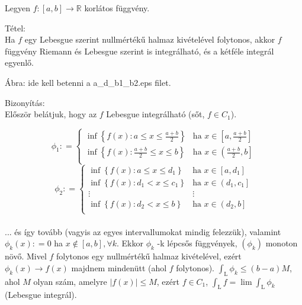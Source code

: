 \documentclass[12pt,a4paper]{scrartcl}
\newenvironment{tetel}{}{}
\newenvironment{bizonyitas}{}{}
\begin{document}
Legyen
\(\left. f:\left\lbrack {a,b} \right\rbrack\rightarrow{\mathbb{R}} \right.\)
korlátos függvény.

\begin{tetel}

Tétel:\\
Ha \(f\) egy Lebesgue szerint nullmértékű halmaz kivételével folytonos,
akkor \(f\) függvény Riemann és Lebesgue szerint is integrálható, és a
kétféle integrál egyenlő.

Ábra: ide kell betenni a a\_d\_b1\_b2.eps filet.

\end{tetel}

\begin{bizonyitas}

Bizonyítás:\\
Először belátjuk, hogy az \(f\) Lebesgue integrálható (sőt,
\(f \in C_{1}\)).

\[\phi_{1}: = \left\{ \begin{matrix}
{\inf\left\{ {f\left( x \right):a \leq x \leq \frac{a + b}{2}} \right\}} & {\text{ha~}x \in \left\lbrack {a,\frac{a + b}{2}} \right\rbrack} \\
{\inf\left\{ {f\left( x \right):\frac{a + b}{2} \leq x \leq b} \right\}} & {\text{ha~}x \in \left( {\frac{a + b}{2},b} \right\rbrack} \\
\end{matrix} \right.\] \[\phi_{2}: = \begin{cases}
{\inf\left\{ {f\left( x \right):a \leq x \leq d_{1}} \right\}} & {\text{ha~}x \in \left\lbrack {a,d_{1}} \right\rbrack} \\
{\inf\left\{ {f\left( x \right):d_{1} < x \leq c_{1}} \right\}} & {\text{ha~}x \in \left( {d_{1},c_{1}} \right\rbrack} \\
 \vdots & \vdots \\
{\inf\left\{ {f\left( x \right):d_{2} < x \leq b} \right\}} & {\text{ha~}x \in \left( {d_{2},b} \right\rbrack} \\
\end{cases}\]\\
... és így tovább (vagyis az egyes intervallumokat mindig felezzük),
valamint \(\phi_{k}\left( x \right): = 0\) ha
\(x \notin \left\lbrack {a,b} \right\rbrack,\forall k\). Ekkor
\(\phi_{k}\) -k lépcsős függvények, \(\left( \phi_{k} \right)\) monoton
növő. Mivel \(f\) folytonos egy nullmértékű halmaz kivételével, ezért
\(\left. \phi_{k}\left( x \right)\rightarrow f\left( x \right) \right.\)
majdnem mindenütt (ahol \(f\) folytonos).
\({\int_{\text{L}}\phi_{k}} \leq \left( {b - a} \right)M\), ahol \(M\)
olyan szám, amelyre \(\left| {f\left( x \right)} \right| \leq M\), ezért
\(f \in C_{1}\), \({\int_{\text{L}}f} = \lim{\int_{\text{L}}\phi_{k}}\)
(Lebesgue integrál).


\end{bizonyitas}
\end{document}
